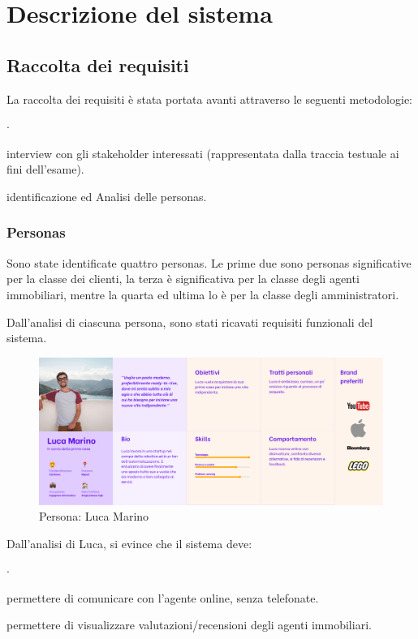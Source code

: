 \chapter{Descrizione del sistema}
\section{Raccolta dei requisiti}
La raccolta dei requisiti è stata portata avanti attraverso le seguenti metodologie:
\begin{list}{$\cdot$}{}
    \item interview con gli stakeholder interessati (rappresentata dalla traccia testuale ai fini dell’esame).
    \item identificazione ed Analisi delle personas.
\end{list}

\subsection{Personas}
Sono state identificate quattro personas. Le prime due sono personas
significative per la classe dei clienti, la terza è significativa per
la classe degli agenti immobiliari, mentre la quarta ed ultima lo è
per la classe degli amministratori.

\noindent
Dall'analisi di ciascuna persona, sono stati ricavati requisiti funzionali del sistema.

\begin{figure}[h]
    \centering
    \includegraphics[width=\textwidth]{assets/personas/luca-marino.png}
    \caption{Persona: Luca Marino}
    \label{fig:luca-marino}
\end{figure}

\noindent
Dall'analisi di Luca, si evince che il sistema deve:
\begin{list}{$\cdot$}{}
    \item permettere di comunicare con l’agente online, senza telefonate.
    \item permettere di visualizzare valutazioni/recensioni degli agenti immobiliari.
\end{list}


